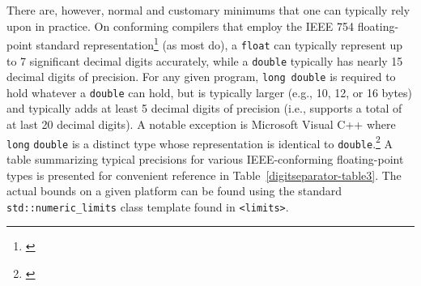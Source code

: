 There are, however, normal and customary minimums that one can typically
rely upon in practice. On conforming compilers that employ the IEEE 754
floating-point standard representation\footnote{\cite{ieee19}} (as most do),
a \lstinline!float! can typically represent up to 7 significant decimal
digits accurately, while a \lstinline!double! typically has nearly 15 decimal
digits of precision. For any given program,
\lstinline!long!~\lstinline!double! is required to hold whatever a
\lstinline!double! can hold, but is typically larger (e.g., 10, 12, or 16
bytes) and typically adds at least 5 decimal digits of precision (i.e.,
supports a total of at last 20 decimal digits). A notable exception is Microsoft Visual C++ where \lstinline!long! \lstinline!double! is a distinct type whose representation is identical to \lstinline!double!.\footnote{\cite{microsoft-types}} A table summarizing
typical precisions for various IEEE-conforming floating-point types is
presented for convenient reference in Table~\ref{digitseparator-table3}. The actual bounds on a
given platform can be found using the standard
\lstinline!std::numeric_limits! class template found in \lstinline!<limits>!.
\pagebreak%



